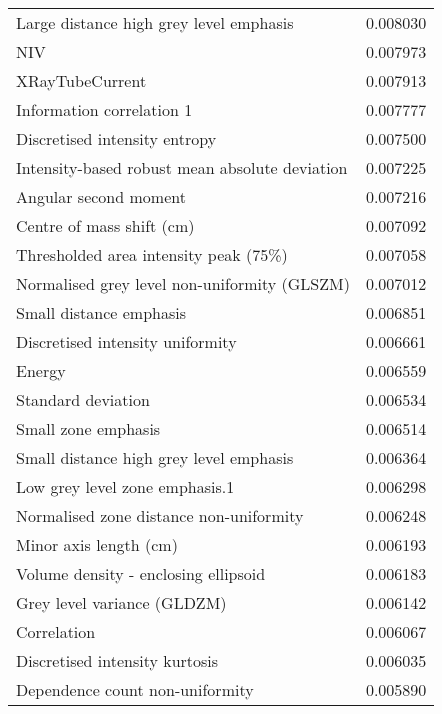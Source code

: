 \begin{tabular}{lr}
Large distance high grey level emphasis            &        0.008030 \\
NIV                                                &        0.007973 \\
XRayTubeCurrent                                    &        0.007913 \\
Information correlation 1                          &        0.007777 \\
Discretised intensity entropy                      &        0.007500 \\
Intensity-based robust mean absolute deviation     &        0.007225 \\
Angular second moment                              &        0.007216 \\
Centre of mass shift (cm)                          &        0.007092 \\
Thresholded area intensity peak (75\%)              &        0.007058 \\
Normalised grey level non-uniformity (GLSZM)       &        0.007012 \\
Small distance emphasis                            &        0.006851 \\
Discretised intensity uniformity                   &        0.006661 \\
Energy                                             &        0.006559 \\
Standard deviation                                 &        0.006534 \\
Small zone emphasis                                &        0.006514 \\
Small distance high grey level emphasis            &        0.006364 \\
Low grey level zone emphasis.1                     &        0.006298 \\
Normalised zone distance non-uniformity            &        0.006248 \\
Minor axis length (cm)                             &        0.006193 \\
Volume density - enclosing ellipsoid               &        0.006183 \\
Grey level variance (GLDZM)                        &        0.006142 \\
Correlation                                        &        0.006067 \\
Discretised intensity kurtosis                     &        0.006035 \\
Dependence count non-uniformity                    &        0.005890 \\

\end{tabular}
